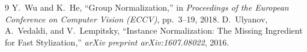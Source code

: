 \documentclass[11pt,a4paper]{article}
\theoremstyle{definition}
\begin{document}
\begin{thebibliography}{9}
 Y.~Wu and K.~He, ``Group Normalization,'' in \emph{Proceedings of the European Conference on Computer Vision (ECCV)}, pp.~3--19, 2018.
 D.~Ulyanov, A.~Vedaldi, and V.~Lempitsky, ``Instance Normalization: The Missing Ingredient for Fast Stylization,'' \emph{arXiv preprint arXiv:1607.08022}, 2016.
\end{thebibliography}
\end{document}
